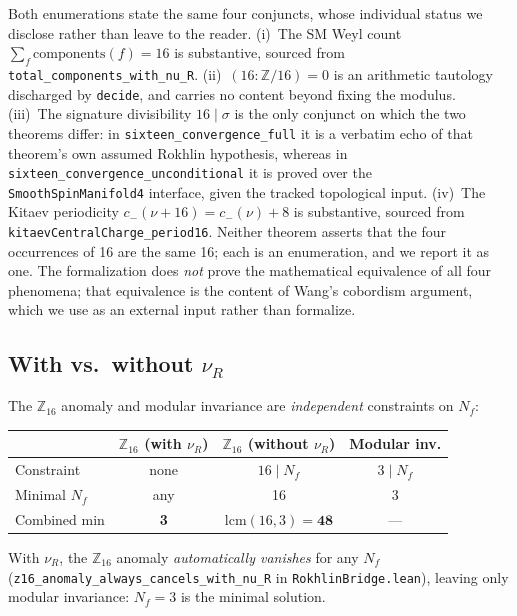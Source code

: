 \documentclass[aps,prl,twocolumn,superscriptaddress]{revtex4-2}
\begin{document}
Both enumerations state the same four conjuncts, whose individual
status we disclose rather than leave to the reader. (i)~The SM Weyl count
$\sum_f \mathrm{components}(f) = 16$ is substantive, sourced from
\texttt{total\_components\_with\_nu\_R}. (ii)~$(16 : \mathbb{Z}/16) = 0$
is an arithmetic tautology discharged by \texttt{decide}, and carries no
content beyond fixing the modulus. (iii)~The signature divisibility
$16 \mid \sigma$ is the only conjunct on which the two theorems differ: in
\texttt{sixteen\_convergence\_full} it is a verbatim echo of that
theorem's own assumed Rokhlin hypothesis, whereas in
\texttt{sixteen\_convergence\_unconditional} it is proved over the
\texttt{SmoothSpinManifold4} interface, given the tracked topological
input. (iv)~The Kitaev periodicity
$c_-(\nu+16) = c_-(\nu) + 8$ is substantive, sourced from
\texttt{kitaevCentralCharge\_period16}. Neither theorem asserts that the
four occurrences of 16 are the same 16; each is an enumeration, and we
report it as one.
The formalization does \emph{not} prove the mathematical equivalence of
all four phenomena; that equivalence is the content of Wang's cobordism
argument, which we use as an external input rather than formalize.

\subsection{With vs.\ without $\nu_R$}

The $\mathbb{Z}_{16}$ anomaly and modular invariance are \emph{independent}
constraints on $N_f$:

\begin{center}
\begin{tabular}{lccc}
\hline
& $\mathbb{Z}_{16}$ (with $\nu_R$) & $\mathbb{Z}_{16}$ (without $\nu_R$) & Modular inv. \\
\hline
Constraint & none & $16 \mid N_f$ & $3 \mid N_f$ \\
Minimal $N_f$ & any & 16 & 3 \\
Combined min & \textbf{3} & $\mathrm{lcm}(16,3) = \textbf{48}$ & --- \\
\hline
\end{tabular}
\end{center}

With $\nu_R$, the $\mathbb{Z}_{16}$ anomaly \emph{automatically vanishes}
for any $N_f$ (\texttt{z16\_anomaly\_always\_cancels\_with\_nu\_R} in
\texttt{RokhlinBridge.lean}), leaving only modular invariance: $N_f = 3$
is the minimal solution.
\end{document}
